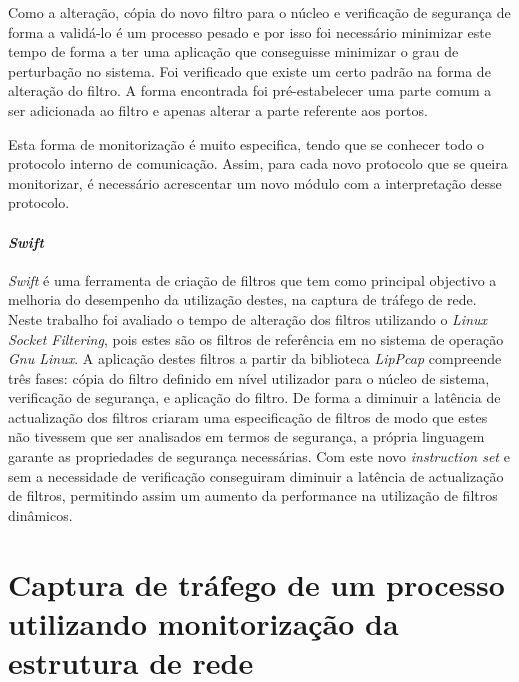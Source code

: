 Como a alteração, cópia do novo filtro para o núcleo e verificação de segurança de forma a validá-lo é um processo pesado e por isso foi necessário minimizar este tempo de forma a ter uma aplicação que conseguisse minimizar o grau de perturbação no sistema.
Foi verificado que existe um certo padrão na forma de alteração do filtro.
A forma encontrada foi pré-estabelecer uma parte comum a ser adicionada ao filtro e apenas alterar a parte referente aos portos.

Esta forma de monitorização é muito especifica, tendo que se conhecer todo o protocolo interno de comunicação.
Assim, para cada novo protocolo que se queira monitorizar, é necessário acrescentar um novo módulo com a interpretação desse protocolo.


\paragraph*{\textit{Swift}}
\textit{Swift} é uma ferramenta de criação de filtros que tem como principal objectivo a melhoria do desempenho da utilização destes, na captura de tráfego de rede.
Neste trabalho foi avaliado o tempo de alteração dos filtros utilizando o \textit{Linux Socket Filtering}, pois estes são os filtros de referência em no sistema de operação \textit{Gnu Linux}.
A aplicação destes filtros a partir da biblioteca \textit{LipPcap} compreende três fases: cópia do filtro definido em nível utilizador para o núcleo de sistema, verificação de segurança, e aplicação do filtro.
De forma a diminuir a latência de actualização dos filtros criaram uma especificação de filtros de modo que estes não tivessem que ser analisados em termos de segurança, a própria linguagem garante as propriedades de segurança necessárias.
Com este novo \textit{instruction set} e sem a necessidade de verificação conseguiram diminuir a latência de actualização de filtros, permitindo assim um aumento da performance na utilização de filtros dinâmicos.

\section{Captura de tráfego de um processo utilizando monitorização da estrutura de rede}\label{sect:outras_abordagens}

